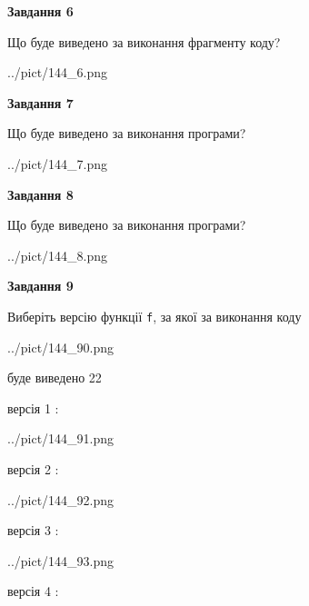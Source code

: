 \documentclass[12pt, ukrainian]{article}
\def\code#1{\Verb!#1!}
\begin{document}
{\begin {large}
{\begin {center}\textbf{Завдання 6}\end {center}}

Що буде виведено за виконання фрагменту коду?\par
\begin{center}
	{../pict/144_6.png}
\end{center}
\newpage

{\begin {center}\textbf{Завдання 7}\end {center}}

Що буде виведено за виконання програми?\par
\begin{center}
	{../pict/144_7.png}
\end{center}
\newpage

{\begin {center}\textbf{Завдання 8}\end {center}}

Що буде виведено за виконання програми?\par
\begin{center}
	{../pict/144_8.png}
\end{center}
\newpage

{\begin {center}\textbf{Завдання 9}\end {center}}

Виберіть версію функції \code{f}, за якої за виконання коду
\begin{center}
	{../pict/144_90.png}
\end{center}
буде виведено 22

\vspace{5mm}
версія 1 :

\begin{center}
	{../pict/144_91.png}
\end{center}
версія 2 :

\begin{center}
	{../pict/144_92.png}
\end{center}
версія 3 :

\begin{center}
	{../pict/144_93.png}
\end{center}
версія 4 :


\end{large}}
\end{document}
